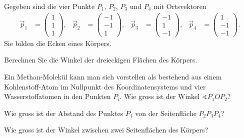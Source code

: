 Gegeben sind die vier Punkte 
$P_1$,
$P_2$,
$P_3$ und $P_4$
mit Ortsvektoren
\begin{align*}
\vec p_1&=\begin{pmatrix} 1\\ 1\\ 1\end{pmatrix},&
\vec p_2&=\begin{pmatrix}-1\\-1\\ 1\end{pmatrix},&
\vec p_3&=\begin{pmatrix}-1\\ 1\\-1\end{pmatrix},&
\vec p_4&=\begin{pmatrix} 1\\-1\\-1\end{pmatrix}.
\end{align*}
Sie bilden die Ecken eines Körpers.
\begin{teilaufgaben}
\item Berechnen Sie die Winkel der dreieckigen Flächen des Körpers.
\item Ein Methan-Molekül kann man sich vorstellen als bestehend aus
einem Kohlenstoff-Atom im Nullpunkt des Koordinatensystems und vier
Wasserstoffatomen in den Punkten $P_i$. Wie gross ist der Winkel
$\sphericalangle P_1 O P_2$?
\item Wie gross ist der Abstand des Punktes $P_1$ von der Seitenfläche
$P_2P_3P_4$?
\item Wie gross ist der Winkel zwischen zwei Seitenflächen des Körpers?
\end{teilaufgaben}

